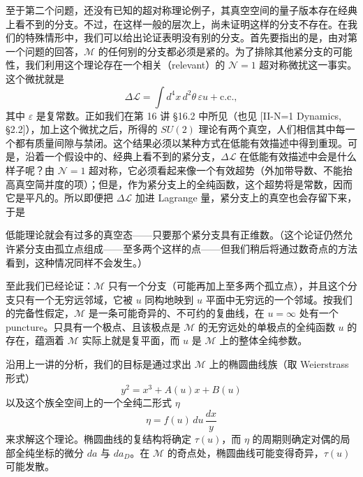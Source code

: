 至于第二个问题，还没有已知的超对称理论例子，其真空空间的量子版本存在经典上看不到的分支。不过，在这样一般的层次上，尚未证明这样的分支不存在。在我们的特殊情形中，我们可以给出论证表明没有别的分支。首先要指出的是，由对第一个问题的回答，$\mathcal{M}$ 的任何别的分支都必须是紧的。为了排除其他紧分支的可能性，我们利用这个理论存在一个相关（relevant）的 $\mathcal{N}=1$ 超对称微扰这一事实。这个微扰就是
\[
\Delta\mathcal{L}=\int d^4x\,d^2\theta\,\varepsilon u+\text{c.c.},
\]
其中 $\varepsilon$ 是复常数。正如我们在第 16 讲 §16.2 中所见（也见 [II-N=1 Dynamics, §2.2]），加上这个微扰之后，所得的 $SU(2)$ 理论有两个真空，人们相信其中每一个都有质量间隙与禁闭。这个结果必须以某种方式在低能有效描述中得到重现。可是，沿着一个假设中的、经典上看不到的紧分支，$\Delta\mathcal{L}$ 在低能有效描述中会是什么样子呢？由 $\mathcal{N}=1$ 超对称，它必须看起来像一个有效超势（外加带导数、不能抬高真空简并度的项）；但是，作为紧分支上的全纯函数，这个超势将是常数，因而它是平凡的。所以即便把 $\Delta\mathcal{L}$ 加进 Lagrange 量，紧分支上的真空也会存留下来，于是

低能理论就会有过多的真空态——只要那个紧分支具有正维数。（这个论证仍然允许紧分支由孤立点组成——至多两个这样的点——但我们稍后将通过数奇点的方法看到，这种情况同样不会发生。）

至此我们已经论证：$\mathcal{M}$ 只有一个分支（可能再加上至多两个孤立点），并且这个分支只有一个无穷远邻域，它被 $u$ 同构地映到 $u$ 平面中无穷远的一个邻域。按我们的完备性假定，$\mathcal{M}$ 是一条可能奇异的、不可约的复曲线，在 $u=\infty$ 处有一个 puncture。只具有一个极点、且该极点是 $\mathcal{M}$ 的无穷远处的单极点的全纯函数 $u$ 的存在，蕴涵着 $\mathcal{M}$ 实际上就是复平面，而 $u$ 是 $\mathcal{M}$ 上的整体全纯参数。


沿用上一讲的分析，我们的目标是通过求出 $\mathcal{M}$ 上的椭圆曲线族（取 Weierstrass 形式）
\[
y^2=x^3+A(u)x+B(u)
\]
以及这个族全空间上的一个全纯二形式 $\eta$
\[
\eta=f(u)\,du\,\frac{dx}{y}
\]
来求解这个理论。椭圆曲线的复结构将确定 $\tau(u)$，而 $\eta$ 的周期则确定对偶的局部全纯坐标的微分 $da$ 与 $da_D$。在 $\mathcal{M}$ 的奇点处，椭圆曲线可能变得奇异，$\tau(u)$ 可能发散。

